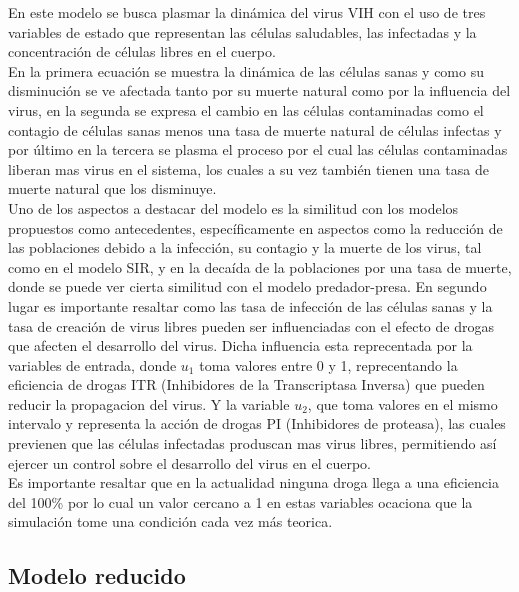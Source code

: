 \documentclass{article}
\begin{document}
En este modelo se busca plasmar la dinámica del virus VIH con el uso de tres
variables de estado que representan las células saludables, las infectadas y la
concentración de células libres en el cuerpo.\\

En la primera ecuación se muestra la dinámica de las células sanas y como su
disminución se ve afectada tanto por su muerte natural como por la influencia
del virus, en la segunda se expresa el cambio en las células
contaminadas como el contagio de células sanas menos una tasa de muerte natural
de células infectas y por último en la tercera se plasma el proceso
por el cual las células contaminadas liberan mas virus en el sistema, los
cuales a su vez también tienen una tasa de muerte natural que los disminuye.\\

Uno de los aspectos a destacar del modelo es la similitud con los modelos
propuestos como antecedentes, específicamente en aspectos como la reducción de
las poblaciones debido a la infección, su contagio y la muerte de los virus,
tal como en el modelo SIR, y en la decaída de la poblaciones por una tasa
de muerte, donde se puede ver cierta similitud con el modelo
predador-presa. En segundo lugar es importante resaltar como las tasa de
infección de las células sanas y la tasa de creación de virus libres pueden
ser influenciadas con el efecto de drogas que afecten el desarrollo del
virus. Dicha influencia esta reprecentada por la variables de entrada, donde $u_1$
toma valores entre 0 y 1, reprecentando la eficiencia de drogas ITR
(Inhibidores de la Transcriptasa Inversa) que pueden reducir la propagacion del
virus. Y la variable $u_2$, que toma valores en el mismo intervalo y representa
la acción de drogas PI (Inhibidores de proteasa), las cuales previenen que las
células infectadas produscan mas virus libres, permitiendo así ejercer un
control sobre el desarrollo del virus en el cuerpo.\\

Es importante resaltar que  en la actualidad ninguna droga llega a una
eficiencia del 100\% por lo cual un valor cercano a 1 en estas variables
ocaciona que la simulación tome una condición cada vez más teorica.\cite{model}\\

    \subsection{Modelo reducido}
\end{document}
